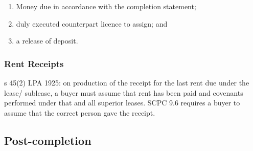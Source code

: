 \documentclass[
]{article}
\providecommand{\tightlist}{%
  \setlength{\itemsep}{0pt}\setlength{\parskip}{0pt}}
\begin{document}
\begin{enumerate}
\tightlist
\item
  Money due in accordance with the completion statement;
\item
  duly executed counterpart licence to assign; and
\item
  a release of deposit.
\end{enumerate}

\hypertarget{rent-receipts}{%
\subsubsection{Rent Receipts}\label{rent-receipts}}

s 45(2) LPA 1925: on production of the receipt for the last rent due
under the lease/ sublease, a buyer must assume that rent has been paid
and covenants performed under that and all superior leases. SCPC 9.6
requires a buyer to assume that the correct person gave the receipt.

\hypertarget{post-completion-1}{%
\subsection{Post-completion}\label{post-completion-1}}
\end{document}
